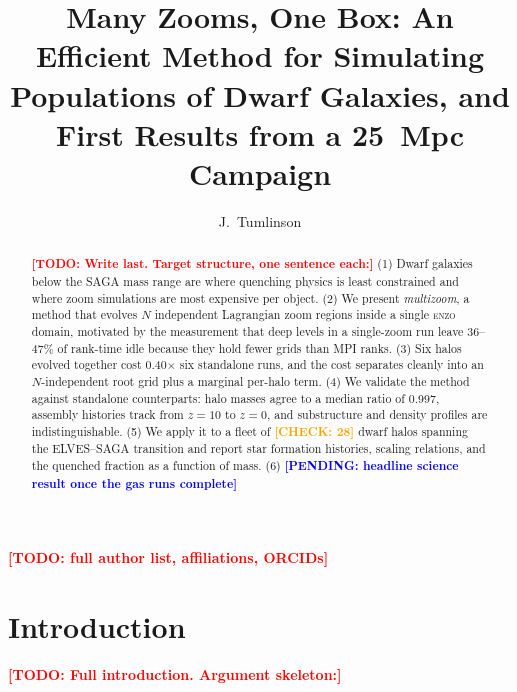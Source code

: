\documentclass[twocolumn,linenumbers]{aastex631}
\newcommand{\todo}[1]{\textcolor{red}{\textbf{[TODO: #1]}}}
\newcommand{\pending}[1]{\textcolor{blue}{\textbf{[PENDING: #1]}}}
\newcommand{\check}[1]{\textcolor{orange}{\textbf{[CHECK: #1]}}}
\newcommand{\measured}[1]{#1}
\newcommand{\enzo}{\textsc{enzo}}
\begin{document}
\title{Many Zooms, One Box: An Efficient Method for Simulating Populations of
Dwarf Galaxies, and First Results from a 25~Mpc Campaign}

\author{J.~Tumlinson}
\todo{full author list, affiliations, ORCIDs}

\begin{abstract}
\todo{Write last. Target structure, one sentence each:}
(1) Dwarf galaxies below the SAGA mass range are where quenching physics is
least constrained and where zoom simulations are most expensive per object.
(2) We present \emph{multizoom}, a method that evolves $N$ independent
Lagrangian zoom regions inside a single \enzo{} domain, motivated by the
measurement that deep levels in a single-zoom run leave
\measured{36--47\%} of rank-time idle because they hold fewer grids than MPI
ranks.
(3) Six halos evolved together cost \measured{0.40$\times$} six standalone
runs, and the cost separates cleanly into an $N$-independent root grid plus a
marginal per-halo term.
(4) We validate the method against standalone counterparts: halo masses agree
to a median ratio of \measured{0.997}, assembly histories track from $z=10$ to
$z=0$, and substructure and density profiles are indistinguishable.
(5) We apply it to a fleet of \check{28} dwarf halos spanning the
ELVES--SAGA transition and report star formation histories, scaling relations,
and the quenched fraction as a function of mass.
(6) \pending{headline science result once the gas runs complete}
\end{abstract}


\section{Introduction}
\label{sec:intro}

\todo{Full introduction. Argument skeleton:}
\end{document}
